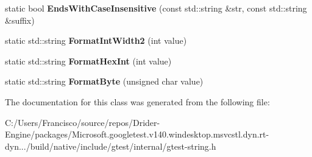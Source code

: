 \begin{DoxyCompactItemize}
\mbox{\label{classtesting_1_1internal_1_1_string_a3de1df085eddc89ef3f3833c67aee3fe}} 
static bool {\bfseries Ends\+With\+Case\+Insensitive} (const std\+::string \&str, const std\+::string \&suffix)
\item 
\mbox{\label{classtesting_1_1internal_1_1_string_a51cab855f7ec6091e5886b6be5598ca2}} 
static std\+::string {\bfseries Format\+Int\+Width2} (int value)
\item 
\mbox{\label{classtesting_1_1internal_1_1_string_a7bedf4780e0c938d203b73ddb17ff490}} 
static std\+::string {\bfseries Format\+Hex\+Int} (int value)
\item 
\mbox{\label{classtesting_1_1internal_1_1_string_ab3555eeb6abe4b7c6f63d865af10379d}} 
static std\+::string {\bfseries Format\+Byte} (unsigned char value)
\end{DoxyCompactItemize}


The documentation for this class was generated from the following file\+:\begin{DoxyCompactItemize}
\item 
C\+:/\+Users/\+Francisco/source/repos/\+Drider-\/\+Engine/packages/\+Microsoft.\+googletest.\+v140.\+windesktop.\+msvcstl.\+dyn.\+rt-\/dyn.../build/native/include/gtest/internal/gtest-\/string.\+h\end{DoxyCompactItemize}
